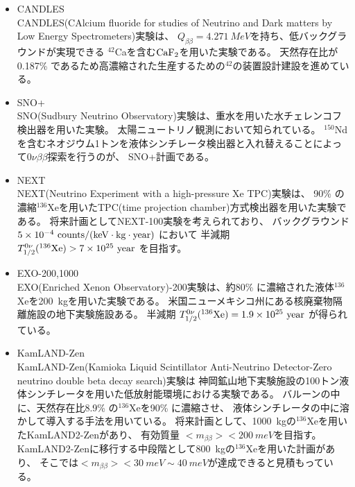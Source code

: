 \documentclass[a4paper,10pt]{jreport}
\begin{document}
\begin{itemize}
	\item CANDLES \\
	CANDLES(CAlcium fluoride for studies of Neutrino and Dark matters by Low Energy Spectrometers)実験は、
	$Q_{\beta\beta}=\SI{4.271}{MeV}$を持ち、低バックグラウンドが実現できる
	$^{42}$Caを含む$\rm{CaF_2}$を用いた実験である。
	天然存在比が0.187\% であるため高濃縮された生産するための$^{42}$の装置設計建設を進めている。
	\cite{CANDLES}
	
	\item SNO+ \\
	SNO(Sudbury Neutrino Observatory)実験は、重水を用いた水チェレンコフ検出器を用いた実験。
	太陽ニュートリノ観測において知られている。
	$^{150}$Ndを含むネオジウム1トンを液体シンチレータ検出器と入れ替えることによって$0\nu\beta\beta$探索を行うのが、
	SNO+計画である。
	
	\item NEXT \\
	 NEXT(Neutrino Experiment with a high-pressure Xe TPC)実験は、
	 90\% の濃縮$^{136}$Xeを用いたTPC(time projection chamber)方式検出器を用いた実験である。
	 将来計画としてNEXT-100実験を考えられており、
	 バックグラウンド $5 \times 10^{-4} \ \rm{ counts/(keV \cdot kg \cdot year)}$
	 において
	 半減期 $T_{1/2}^{0\nu}(^{136}\rm{Xe}) > 7 \times 10^{25} \ \rm{year}$
	 を目指す。
	\cite{NEXT}
	
	\item EXO-200,1000 \\
	EXO(Enriched Xenon Observatory)-200実験は、約80\% に濃縮された液体$^{136}$Xeを\SI{200}{kg}を用いた実験である。
	米国ニューメキシコ州にある核廃棄物隔離施設の地下実験施設ある。
	半減期 $T_{1/2}^{0\nu}(^{136}\rm{Xe}) = 1.9 \times 10^{25} \ \rm{year}$
	が得られている。
	\cite{EXO}
	
	\item KamLAND-Zen \\
	KamLAND-Zen(Kamioka Liquid Scintillator Anti-Neutrino Detector-Zero neutrino double beta decay search)実験は
	神岡鉱山地下実験施設の100トン液体シンチレータを用いた低放射能環境における実験である。
	バルーンの中に、天然存在比8.9\% の$^{136}$Xeを90\% に濃縮させ、
	液体シンチレータの中に溶かして導入する手法を用いている。
	将来計画として、\SI{1000}{kg}の$^{136}$Xeを用いたKamLAND2-Zenがあり、
	有効質量 $< m_{\beta\beta} > < \SI{200}{meV}$を目指す。
	KamLAND2-Zenに移行する中段階として\SI{800}{kg}の$^{136}$Xeを用いた計画があり、
	そこでは$< m_{\beta\beta} > < \SI{30}{meV} \sim \SI{40}{meV}$が達成できると見積もっている。
	\cite{KamLAND-Zen}
	
\end{itemize}
\end{document}

